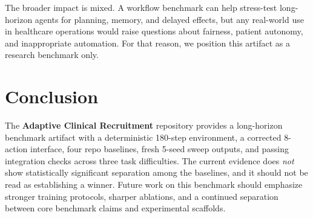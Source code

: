 \documentclass{article}
\begin{document}
The broader impact is mixed. A workflow benchmark can help stress-test long-horizon agents for planning, memory, and delayed effects, but any real-world use in healthcare operations would raise questions about fairness, patient autonomy, and inappropriate automation. For that reason, we position this artifact as a research benchmark only.

\section{Conclusion}

The \textbf{Adaptive Clinical Recruitment} repository provides a long-horizon benchmark artifact with a deterministic 180-step environment, a corrected 8-action interface, four repo baselines, fresh 5-seed sweep outputs, and passing integration checks across three task difficulties. The current evidence does \emph{not} show statistically significant separation among the baselines, and it should not be read as establishing a winner. Future work on this benchmark should emphasize stronger training protocols, sharper ablations, and a continued separation between core benchmark claims and experimental scaffolds.
\end{document}
